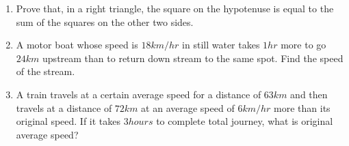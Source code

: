 \documentclass{article}
\begin{document}
\begin{enumerate}
\item Prove that, in a right triangle, the square on the hypotenuse is equal to the sum of the squares on the other two sides.
\item A motor boat whose speed is $18km/hr$ in still water takes $1hr$ more to go $24km$ upstream than to return down stream to the same spot. Find the speed of the stream.
\item A train travels at a certain average speed for a distance of $63km$ and then travels at a distance of $72km$ at an average speed of $6km/hr$ more than its original speed. If it takes $3 hours$ to complete total journey, what is original average speed?
\end{enumerate}
\end{document}
